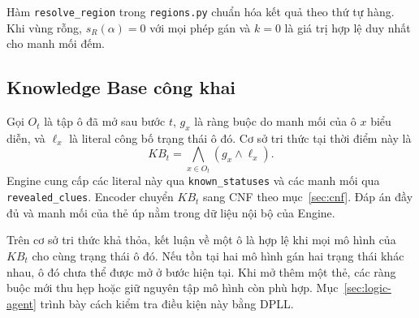 Hàm \texttt{resolve\_region} trong \texttt{regions.py} chuẩn hóa kết quả
theo thứ tự hàng. Khi vùng rỗng, $s_R(\alpha)=0$ với mọi phép gán và
$k=0$ là giá trị hợp lệ duy nhất cho manh mối đếm.

\subsection{Knowledge Base công khai}

Gọi $O_t$ là tập ô đã mở sau bước $t$, $g_x$ là ràng buộc do manh mối
của ô $x$ biểu diễn, và $\ell_x$ là literal công bố trạng thái ô đó.
Cơ sở tri thức tại thời điểm này là
\[
KB_t=\bigwedge_{x\in O_t}(g_x\land \ell_x).
\]
Engine cung cấp các literal này qua \texttt{known\_statuses} và các
manh mối qua \texttt{revealed\_clues}. Encoder chuyển $KB_t$ sang CNF
theo mục~\ref{sec:cnf}. Đáp án đầy đủ và manh mối của thẻ úp nằm trong
dữ liệu nội bộ của Engine.

Trên cơ sở tri thức khả thỏa, kết luận về một ô là hợp lệ khi mọi mô
hình của $KB_t$ cho cùng trạng thái ô đó. Nếu tồn tại hai mô hình gán
hai trạng thái khác nhau, ô đó chưa thể được mở ở bước hiện tại. Khi
mở thêm một thẻ, các ràng buộc mới thu hẹp hoặc giữ nguyên tập mô hình
còn phù hợp. Mục~\ref{sec:logic-agent} trình bày cách kiểm tra điều kiện
này bằng DPLL.
